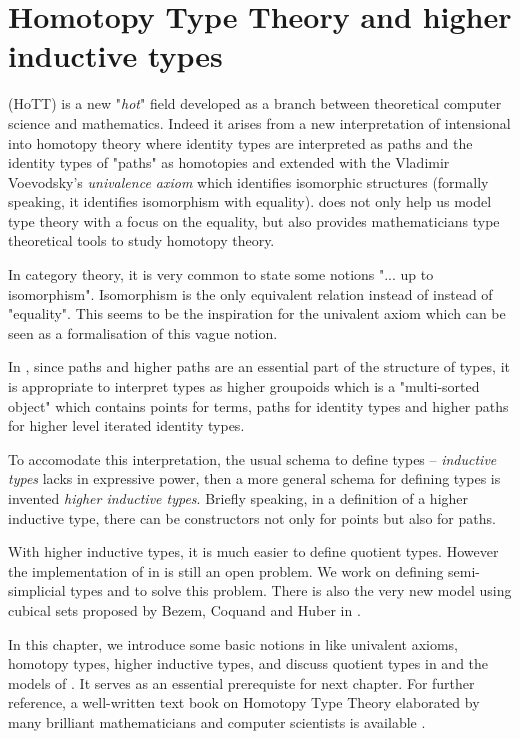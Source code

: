 \chapter{Homotopy Type Theory and higher inductive types}\label{HITs}


\hott (HoTT) is a new "\emph{hot}" field developed as a
branch between theoretical computer science
and mathematics. Indeed it arises from a new interpretation of intensional \mltt
into homotopy theory where identity types are interpreted as paths and
the identity types of "paths" as homotopies and extended with the Vladimir Voevodsky's \emph{univalence axiom} which identifies isomorphic
structures (formally speaking, it identifies isomorphism with
equality). 
\hott does not only help us model type theory with a focus on the equality, but also provides mathematicians type theoretical tools to study homotopy theory.

In category theory, it is very common to state some notions "... up to
isomorphism". Isomorphism is the only equivalent relation instead of
instead of "equality". This seems to be the inspiration for the
univalent axiom which can be seen as a formalisation of this vague notion.

In \hott, since paths and higher paths are an essential part of the
structure of types,  it is appropriate to interpret types as higher groupoids
which is a "multi-sorted object" which contains points for terms,
paths for identity types and higher paths for higher level iterated identity
types\cite{hott-online}. 

To accomodate this interpretation, the usual schema to define types --
\emph{inductive
types} lacks in expressive power, then a more
general schema for defining types is invented \textemdash \emph{higher
inductive types}. Briefly speaking, in a definition of a higher inductive type, there can
be constructors not only for points but also for paths.

With higher inductive types, it is much easier to define quotient
types. However the implementation of \hott in \itt is still an open problem. We
work on defining semi-simplicial types and \wog to solve this problem. There
is also the very new model using cubical sets proposed by Bezem,
Coquand and Huber in \cite{bezem2013model}.

In this chapter, we introduce some basic notions in \hott like
univalent axioms, homotopy types,
higher inductive types, and discuss quotient types in \hott and the
models of \hott. It serves as an essential prerequiste for next chapter.
For further reference, a well-written text book on Homotopy Type
Theory elaborated by many brilliant mathematicians and computer scientists is available \cite{hott}. 








